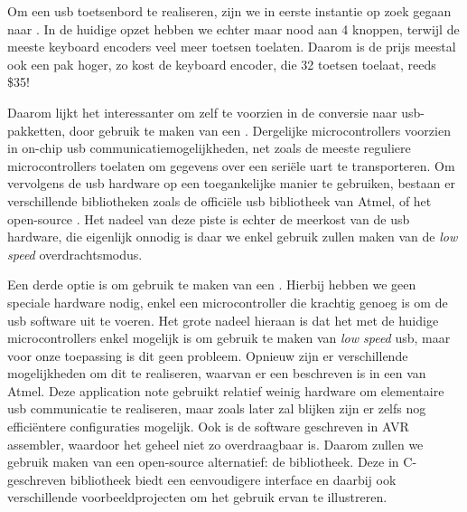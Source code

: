 Om een \ac{usb} toetsenbord te realiseren, zijn we in eerste instantie op zoek gegaan naar . In de huidige opzet hebben we echter maar nood aan 4 knoppen, terwijl de meeste keyboard encoders veel meer toetsen toelaten. Daarom is de prijs meestal ook een pak hoger, zo kost de  keyboard encoder, die 32 toetsen toelaat, reeds \$35!

Daarom lijkt het interessanter om zelf te voorzien in de conversie naar \ac{usb}-pakketten, door gebruik te maken van een . Dergelijke microcontrollers voorzien in on-chip \ac{usb} communicatiemogelijkheden, net zoals de meeste reguliere microcontrollers toelaten om gegevens over een seriële \ac{uart} te transporteren. Om vervolgens de \ac{usb} hardware op een toegankelijke manier te gebruiken, bestaan er verschillende bibliotheken zoals de officiële \ac{usb} bibliotheek van Atmel, of het open-source . Het nadeel van deze piste is echter de meerkost van de \ac{usb} hardware, die eigenlijk onnodig is daar we enkel gebruik zullen maken van de \emph{low speed} overdrachtsmodus.

Een derde optie is om gebruik te maken van een . Hierbij hebben we geen speciale hardware nodig, enkel een microcontroller die krachtig genoeg is om de \ac{usb} software uit te voeren. Het grote nadeel hieraan is dat het met de huidige microcontrollers enkel mogelijk is om gebruik te maken van \emph{low speed} \ac{usb}, maar voor onze toepassing is dit geen probleem. Opnieuw zijn er verschillende mogelijkheden om dit te realiseren, waarvan er een beschreven is in een  van Atmel. Deze application note gebruikt relatief weinig hardware om elementaire \ac{usb} communicatie te realiseren, maar zoals later zal blijken zijn er zelfs nog efficiëntere configuraties mogelijk. Ook is de software geschreven in AVR assembler, waardoor het geheel niet zo overdraagbaar is. Daarom zullen we gebruik maken van een open-source alternatief: de  bibliotheek. Deze in C-geschreven bibliotheek biedt een eenvoudigere interface en daarbij ook verschillende voorbeeldprojecten om het gebruik ervan te illustreren.


%
%

